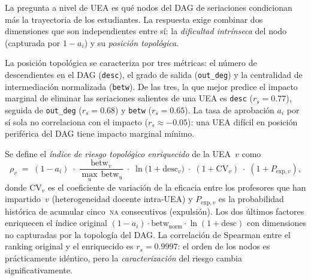 \documentclass[11pt,letterpaper]{article}
\begin{document}
La pregunta a nivel de UEA es qué nodos del DAG de seriaciones condicionan más la trayectoria de los estudiantes.
La respuesta exige combinar dos dimensiones que son independientes entre sí:
la \emph{dificultad intrínseca} del nodo (capturada por $1-a_i$) y su \emph{posición topológica}.

La posición topológica se caracteriza por tres métricas: el número de descendientes en el DAG (\texttt{desc}), el grado de salida (\texttt{out\_deg}) y la centralidad de intermediación normalizada (\texttt{betw}).
De las tres, la que mejor predice el impacto marginal de eliminar las seriaciones salientes de una UEA es \texttt{desc} ($r_s=0.77$), seguida de \texttt{out\_deg} ($r_s=0.68$) y \texttt{betw} ($r_s=0.65$).
La tasa de aprobación $a_i$ por sí sola no correlaciona con el impacto ($r_s\approx -0.05$): una UEA difícil en posición periférica del DAG tiene impacto marginal mínimo.

Se define el \emph{índice de riesgo topológico enriquecido} de la UEA~$v$ como
\begin{equation}
  \rho_v
  \;=\; (1 - a_i)\;\cdot\;
        \frac{\mathrm{betw}_v}{\displaystyle\max_{u}\,\mathrm{betw}_u}
        \;\cdot\;
        \ln\!\bigl(1 + \mathrm{desc}_v\bigr)
        \;\cdot\;
        (1 + \mathrm{CV}_v)
        \;\cdot\;
        (1 + P_{\mathrm{exp},v}),
  \label{eq:risk}
\end{equation}
donde $\mathrm{CV}_v$ es el coeficiente de variación de la eficacia entre los
profesores que han impartido~$v$ (heterogeneidad docente intra-UEA) y
$P_{\mathrm{exp},v}$ es la probabilidad histórica de acumular cinco~\textsc{na}
consecutivos (expulsión).
Los dos últimos factores enriquecen el índice original
$(1-a_i)\cdot\mathrm{betw}_{\mathrm{norm}}\cdot\ln(1+\mathrm{desc})$ con
dimensiones no capturadas por la topología del DAG.
La correlación de Spearman entre el ranking original y el enriquecido es
$r_s=0.9997$: el orden de los nodos es prácticamente idéntico, pero la
\emph{caracterización} del riesgo cambia significativamente.
\end{document}
